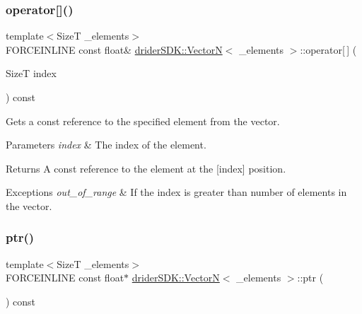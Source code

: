 \subsubsection{\texorpdfstring{operator[]()}{operator[]()}\hspace{0.1cm}{\footnotesize\ttfamily [2/2]}}
{\footnotesize\ttfamily template$<$SizeT \+\_\+elements$>$ \\
F\+O\+R\+C\+E\+I\+N\+L\+I\+NE const float\& \hyperlink{classdrider_s_d_k_1_1_vector_n}{drider\+S\+D\+K\+::\+VectorN}$<$ \+\_\+elements $>$\+::operator\mbox{[}$\,$\mbox{]} (\begin{DoxyParamCaption}\item[{SizeT}]{index }\end{DoxyParamCaption}) const\hspace{0.3cm}{\ttfamily [inline]}}

Gets a const reference to the specified element from the vector.


\begin{DoxyParams}{Parameters}
{\em index} & The index of the element.\\
\hline
\end{DoxyParams}
\begin{DoxyReturn}{Returns}
A const reference to the element at the \mbox{[}index\mbox{]} position.
\end{DoxyReturn}

\begin{DoxyExceptions}{Exceptions}
{\em out\+\_\+of\+\_\+range} & If the index is greater than number of elements in the vector. \\
\hline
\end{DoxyExceptions}
\mbox{\label{classdrider_s_d_k_1_1_vector_n_a54fc08312e0789aa3bd7dcb5c2076f4d}} 
\subsubsection{\texorpdfstring{ptr()}{ptr()}}
{\footnotesize\ttfamily template$<$SizeT \+\_\+elements$>$ \\
F\+O\+R\+C\+E\+I\+N\+L\+I\+NE const float$\ast$ \hyperlink{classdrider_s_d_k_1_1_vector_n}{drider\+S\+D\+K\+::\+VectorN}$<$ \+\_\+elements $>$\+::ptr (\begin{DoxyParamCaption}{ }\end{DoxyParamCaption}) const\hspace{0.3cm}{\ttfamily [inline]}}

